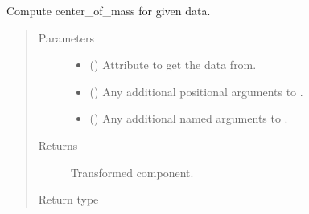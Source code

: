 \documentclass[letterpaper,10pt,english]{sphinxmanual}
\begin{document}
\begin{fulllineitems}
\begin{fulllineitems}
\label{\detokenize{api/base_classes:geology.src.base_spatial.SpatialComponent.center_of_mass}}
Compute center\_of\_mass for given data.
\begin{quote}\begin{description}
\item[{Parameters}] \leavevmode\begin{itemize}
\item {} 
 (\sphinxstyleliteralemphasis{\sphinxupquote{, }}) \textendash{} Attribute to get the data from.

\item {} 
 () \textendash{} Any additional positional arguments to .

\item {} 
 () \textendash{} Any additional named arguments to .

\end{itemize}

\item[{Returns}] \leavevmode
{} \textendash{} Transformed component.

\item[{Return type}] \leavevmode
{\hyperref[\detokenize{api/base_classes:geology.src.base_spatial.SpatialComponent}]{}}

\end{description}\end{quote}

\end{fulllineitems}



\end{fulllineitems}
\end{document}
